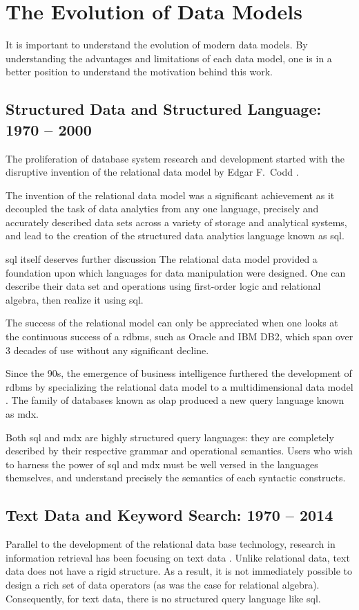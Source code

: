 \section{The Evolution of Data Models}
	It is important to understand the evolution of modern data models.  By understanding the advantages and limitations of each data model, one is in a better position to understand the motivation behind this work.
	
	\subsection{Structured Data and Structured Language:  1970 -- 2000}
		The proliferation of database system research and development started with the disruptive invention of the relational data model by Edgar F.~Codd \cite{codd-79}.
		
		The invention of the relational data model was a significant achievement as it decoupled the task of data analytics from any one language, precisely and accurately described data sets across a variety of storage and analytical systems, and lead to the creation of the structured data analytics language known as \gls{sql}.
		
		\gls{sql} itself deserves further discussion  The relational data model provided a foundation upon which languages for data manipulation were designed.  One can describe their data set and operations using first-order logic and relational algebra, then realize it using \gls{sql}.
		
		The success of the relational model can only be appreciated when one looks at the continuous success of a \gls{rdbms}, such as Oracle and IBM DB2, which span over 3 decades of use without any significant decline.
		
		Since the 90s, the emergence of business intelligence \cite{bikm-02} furthered the development of \gls{rdbms} by specializing the relational data model to a multidimensional data model \cite{colliat-96}.  The family of databases known as \gls{olap} produced a new query language known as \gls{mdx}.
		
		Both \gls{sql} and \gls{mdx} are highly structured query languages: they are completely described by their respective grammar and operational semantics.  Users who wish to harness the power of \gls{sql} and \gls{mdx} must be well versed in the languages themselves, and understand precisely the semantics of each syntactic constructs.
		
	\subsection{Text Data and Keyword Search:  1970 -- 2014}
		Parallel to the development of the relational data base technology, research in information retrieval has been focusing on text data \cite{salton-88, jones-72}.  Unlike relational data, text data does not have a rigid structure.  As a result, it is not immediately possible to design a rich set of data operators (as was the case for relational algebra).  Consequently, for text data, there is no structured query language like \gls{sql}.
		
